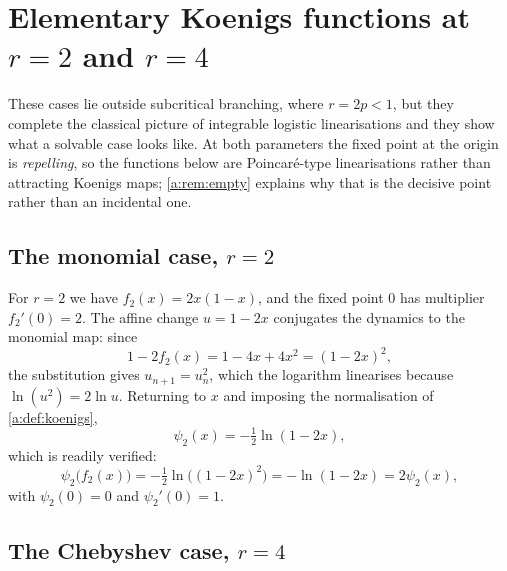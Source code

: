 \renewcommand{\thesection}{\thechapter.\Alph{section}}
\setcounter{section}{0}

\section{Elementary Koenigs functions at \texorpdfstring{$r=2$ and $r=4$}{r=2 and r=4}}
\label{a:app:integrable}

These cases lie outside subcritical branching, where $r=2p<1$, but they complete
the classical picture of integrable logistic linearisations and they show what a
solvable case looks like. At both parameters the fixed point at the origin is
\emph{repelling}, so the functions below are Poincaré-type linearisations rather
than attracting Koenigs maps; \cref{a:rem:empty} explains why that is the decisive
point rather than an incidental one.

\subsection{The monomial case, \texorpdfstring{$r=2$}{r=2}}
\label{a:app:r2}

For $r=2$ we have $f_2(x) = 2x(1-x)$, and the fixed point $0$ has multiplier
$f_2'(0)=2$. The affine change $u=1-2x$ conjugates the dynamics to the monomial
map: since
\begin{equation*}
1-2f_2(x) = 1-4x+4x^2 = (1-2x)^2,
\end{equation*}
the substitution gives $u_{n+1} = u_n^2$, which the logarithm linearises because
$\ln(u^2) = 2\ln u$. Returning to $x$ and imposing the normalisation of
\cref{a:def:koenigs},
\begin{equation}
\label{a:eq:psi2}
\psi_2(x) = -\tfrac12\ln(1-2x),
\end{equation}
which is readily verified:
\begin{equation*}
\psi_2\bigl(f_2(x)\bigr) = -\tfrac12\ln\bigl((1-2x)^2\bigr) = -\ln(1-2x)
= 2\psi_2(x),
\end{equation*}
with $\psi_2(0)=0$ and $\psi_2'(0)=1$.

\subsection{The Chebyshev case, \texorpdfstring{$r=4$}{r=4}}
\label{a:app:r4}

